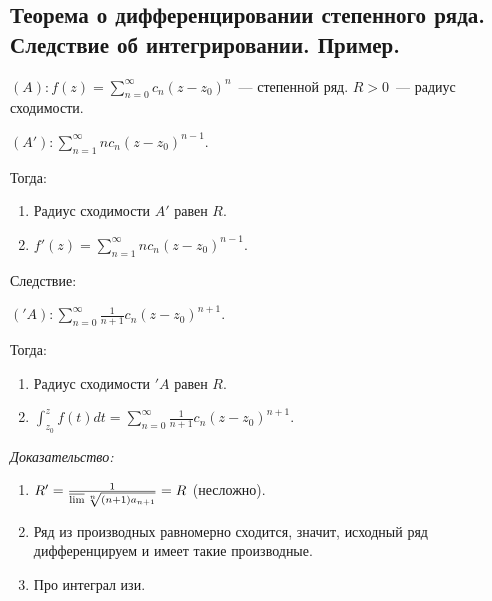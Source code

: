 \documentclass[paper=a4, fontsize=11pt]{article}
\begin{document}
\subsection{Теорема о дифференцировании степенного ряда. Следствие об интегрировании. Пример.}
$(A): f(z)=\sum_{n=0}^{\infty}c_n(z-z_0)^n$~--- степенной ряд. $R>0$~--- радиус сходимости.

$(A'): \sum_{n=1}^{\infty}n c_n(z-z_0)^{n-1}$.

Тогда:
\begin{enumerate}
    \item Радиус сходимости $A'$ равен $R$.
    \item $f'(z) = \sum_{n=1}^{\infty}n c_n(z-z_0)^{n-1}$.
\end{enumerate}

Следствие: 

$('A): \sum_{n=0}^{\infty}\frac{1}{n+1} c_n(z-z_0)^{n+1}$.

Тогда:
\begin{enumerate}
    \item Радиус сходимости $'A$ равен $R$.
    \item $\int_{z_0}^z f(t)dt = \sum_{n=0}^{\infty}\frac{1}{n+1} c_n(z-z_0)^{n+1}$.
\end{enumerate}

\emph{Доказательство:}
\begin{enumerate}
    \item $R' = \frac{1}{\varlimsup \sqrt[n]{(n+1)a_{n+1}}} = R$ (несложно).
    \item Ряд из производных равномерно сходится, значит, исходный ряд дифференцируем и имеет такие производные.
    \item Про интеграл изи.
\end{enumerate}
\end{document}

